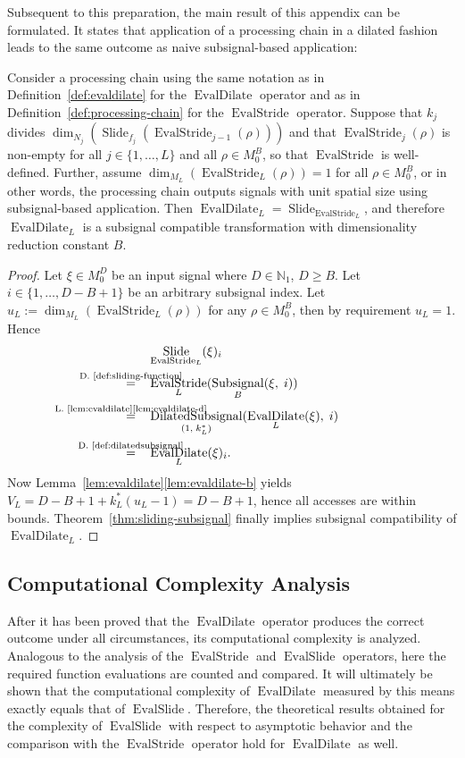 \documentclass[journal]{IEEEtran}
\newcommand{\N}{\mathbb{N}}
\newcommand{\ROI}{B}
\newcommand{\discint}[2]{\{#1,\dotsc,#2\}}
\newcommand{\inint}[2]{\in\discint{#1}{#2}}
\DeclareMathOperator{\Subsignal}{Subsignal}
\DeclareMathOperator{\Slide}{Slide}
\DeclareMathOperator{\EvalStride}{EvalStride}
\DeclareMathOperator{\EvalSlide}{EvalSlide}
\newcommand{\equsing}[1]{\overset{\mathclap{\text{#1}}}{=}}
\DeclareMathOperator{\DilatedSubsignal}{DilatedSubsignal}
\DeclareMathOperator{\EvalDilate}{EvalDilate}
\begin{document}
Subsequent to this preparation, the main result of this appendix can be formulated.
It states that application of a processing chain in a dilated fashion leads to the same outcome as naive subsignal-based application:
\begin{theorem}
Consider a processing chain using the same notation as in Definition~\ref{def:evaldilate} for the $\EvalDilate$ operator and as in Definition~\ref{def:processing-chain} for the $\EvalStride$ operator.
Suppose that $k_j$ divides $\dim_{N_j}(\Slide_{f_j}(\EvalStride_{j - 1}(\rho)))$ and that $\EvalStride_{j}(\rho)$ is non-empty for all $j\inint{1}{L}$ and all $\rho\in M_0^\ROI$, so that $\EvalStride$ is well-defined.
Further, assume $\dim_{M_L}(\EvalStride_L(\rho)) = 1$ for all $\rho\in M_0^\ROI$, or in other words, the processing chain outputs signals with unit spatial size using subsignal-based application.
Then $\EvalDilate_L = \Slide_{\EvalStride_L}$, and therefore $\EvalDilate_L$ is a subsignal compatible transformation with dimensionality reduction constant $\ROI$.
\end{theorem}\begin{proof}
Let $\xi\in M_0^D$ be an input signal where $D\in\N_1$, $D\geq\ROI$.
Let $i\inint{1}{D - \ROI + 1}$ be an arbitrary subsignal index.
Let $u_L := \dim_{M_L}(\EvalStride_L(\rho))$ for any $\rho\in M_0^\ROI$, then by requirement $u_L = 1$.
Hence
\begin{align*}
  & \Slide_{\EvalStride_L}(\xi)_i\\
  \equsing{D.~\ref{def:sliding-function}}\ \ \ & \EvalStride_L(\Subsignal_\ROI(\xi,\; i))\\
  \equsing{L.~\ref{lem:evaldilate}\ref{lem:evaldilate-d}}\ \ \ & \DilatedSubsignal_{(1,\; k_L^*)}(\EvalDilate_L(\xi),\; i)\\
  \equsing{D.~\ref{def:dilatedsubsignal}}\ \ \ & \EvalDilate_L(\xi)_i\text{.}
\end{align*}
Now Lemma~\ref{lem:evaldilate}\ref{lem:evaldilate-b} yields $V_L = D - \ROI + 1 + k_L^*(u_L - 1) = D - \ROI + 1$, hence all accesses are within bounds.
Theorem~\ref{thm:sliding-subsignal} finally implies subsignal compatibility of $\EvalDilate_L$.
\end{proof}\subsection{Computational Complexity Analysis}
After it has been proved that the $\EvalDilate$ operator produces the correct outcome under all circumstances, its computational complexity is analyzed.
Analogous to the analysis of the $\EvalStride$ and $\EvalSlide$ operators, here the required function evaluations are counted and compared.
It will ultimately be shown that the computational complexity of $\EvalDilate$ measured by this means exactly equals that of $\EvalSlide$.
Therefore, the theoretical results obtained for the complexity of $\EvalSlide$ with respect to asymptotic behavior and the comparison with the $\EvalStride$ operator hold for $\EvalDilate$ as well.
\end{document}
